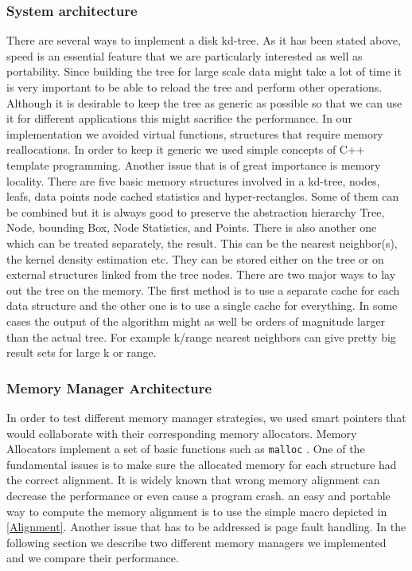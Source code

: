 \documentclass[12pt,letterpaper,doublespaced,ETD,dvips,proposal]{gtthesis}
\begin{document}
\begin{Body}
\subsubsection{System architecture} There are several ways to
implement a disk kd-tree. As it has been stated above, speed is an
essential feature that we are particularly interested as well as
portability. Since building the tree for large scale data might take
a lot of time it is very important to be able to reload the tree and
perform other operations. Although it is desirable to keep the tree
as generic as possible so that we can use it for different
applications this might sacrifice the performance. In our
implementation we avoided virtual functions, structures that require
memory reallocations. In order to keep it generic we used simple
concepts of C++ template programming. Another issue that is of great
importance is memory locality. There are five basic memory
structures involved in a kd-tree, nodes, leafs, data points node
cached statistics and hyper-rectangles. Some of them can be combined
but it is always good to preserve the abstraction hierarchy Tree,
Node, bounding Box, Node Statistics, and Points. There is also
another one which can be treated separately, the result. This can be
the nearest neighbor(s), the kernel density estimation etc. They can
be stored either on the tree or on external structures linked from
the tree nodes. There are two major ways to lay out the tree on the
memory. The first method is to use a separate cache for each data
structure and the other one is to use  a single cache for
everything. In some cases the output of the algorithm might as well
be orders of magnitude larger than the actual tree. For example
k/range nearest neighbors can give pretty big result sets for large
k or range.

\subsubsection{Memory Manager Architecture} In order to test
different memory manager strategies, we used smart pointers that
would collaborate with their corresponding memory allocators. Memory
Allocators implement a set of basic functions such as
{\verb"malloc" }.
One of the fundamental issues is to make sure the allocated memory for each
structure had the correct alignment. It is widely known that wrong
memory alignment can decrease the performance or even cause a
program crash. an easy and portable way to compute the memory
alignment is to use the simple macro depicted in \ref{Alignment}. Another issue
that has to be addressed is page fault handling. In the following
section we describe two different memory managers we implemented and
we compare their performance.


\end{Body}
\end{document}
